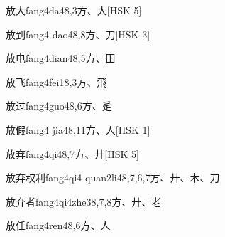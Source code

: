 \begin{EntryWithPhonetic}{放大}{fang4da4}{8,3}{⽅、⼤}[HSK 5]
\end{EntryWithPhonetic}

\begin{EntryWithPhonetic}{放到}{fang4 dao4}{8,8}{⽅、⼑}[HSK 3]
\end{EntryWithPhonetic}

\begin{EntryWithPhonetic}{放电}{fang4dian4}{8,5}{⽅、⽥}
\end{EntryWithPhonetic}

\begin{EntryWithPhonetic}{放飞}{fang4fei1}{8,3}{⽅、⾶}
\end{EntryWithPhonetic}

\begin{EntryWithPhonetic}{放过}{fang4guo4}{8,6}{⽅、⾡}
\end{EntryWithPhonetic}

\begin{EntryWithPhonetic}{放假}{fang4 jia4}{8,11}{⽅、⼈}[HSK 1]
\end{EntryWithPhonetic}

\begin{EntryWithPhonetic}{放弃}{fang4qi4}{8,7}{⽅、⼶}[HSK 5]
\end{EntryWithPhonetic}

\begin{EntryWithPhonetic}{放弃权利}{fang4qi4 quan2li4}{8,7,6,7}{⽅、⼶、⽊、⼑}
\end{EntryWithPhonetic}

\begin{EntryWithPhonetic}{放弃者}{fang4qi4zhe3}{8,7,8}{⽅、⼶、⽼}
\end{EntryWithPhonetic}

\begin{EntryWithPhonetic}{放任}{fang4ren4}{8,6}{⽅、⼈}
\end{EntryWithPhonetic}

